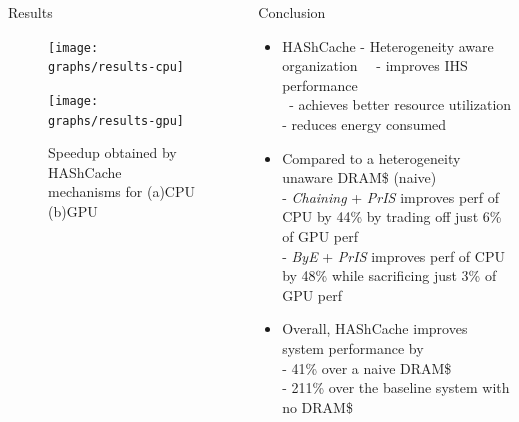 \documentclass[final,t]{beamer}
\begin{document}
\begin{frame}[t,fragile]{}
\begin{columns}[t]
\begin{column}{.48\linewidth}
\begin{tcolorbox}

\end{tcolorbox}
\end{column}

\end{columns}

    \vspace{1.5em}
        \begin{tcolorbox}[colback=red!5!white,
                          colframe=red!75!black,
                         ]
        \begin{columns}[t]
        \begin{column}{.48\linewidth}
       
	
		\begin{exampleblock}{Results}
        	\begin{figure}
				\texttt{[image: graphs/results-cpu]}
			\end{figure}
			\begin{figure}
			   	\texttt{[image: graphs/results-gpu]}
		  	    \caption{Speedup obtained by HAShCache mechanisms for (a)CPU (b)GPU}
			\end{figure} 
		\end{exampleblock}
		
     \end{column}
     \begin{column}{.48\linewidth}
	\begin{exampleblock}{Conclusion}
	\begin{itemize}
	\item HAShCache  \quad - Heterogeneity aware organization \quad \ \  - improves IHS performance  \\ 
	  \qquad \qquad \qquad \ - achieves better resource utilization \quad- reduces energy consumed
	\item Compared to a heterogeneity unaware DRAM\$ (naive) \\
	\quad - \textit{Chaining} + \textit{PrIS} improves perf of CPU by 44\% by trading off just 6\% of GPU perf \\
	\quad - \textit{ByE} + \textit{PrIS} improves perf of CPU by 48\% while sacrificing just 3\% of GPU perf
	\item Overall, HAShCache improves system performance by \\ 
	       \qquad - {\color{red}41\%} over a naive DRAM\$ \\ 
	       \qquad - {\color{red}211\%} over the baseline system with no DRAM\$
	\end{itemize}
	

\end{exampleblock}
\end{column}
\end{columns}
\end{tcolorbox}
\end{frame}
\end{document}
